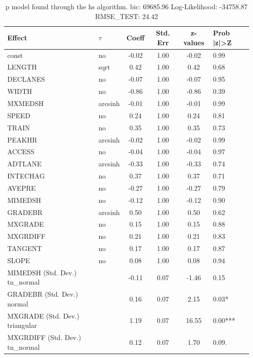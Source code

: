 \begin{table}
	\caption{p model found through the hs algorithm. bic: 69685.96 Log-Likelihood: -34758.87 RMSE_TEST: 24.42}
	\begin{center}
		\begin{tabular}{|l|l|c|c|c|l|}
			\hline
			Effect & $\tau$ & Coeff & Std. Err & z-values & Prob |z|>Z \\
			\hline
			const & no & -0.02 & 1.00 & -0.02 & 0.99 \\
			\hline
			LENGTH & sqrt & 0.42 & 1.00 & 0.42 & 0.68 \\
			\hline
			DECLANES & no & -0.07 & 1.00 & -0.07 & 0.95 \\
			\hline
			WIDTH & no & -0.86 & 1.00 & -0.86 & 0.39 \\
			\hline
			MXMEDSH & arcsinh & -0.01 & 1.00 & -0.01 & 0.99 \\
			\hline
			SPEED & no & 0.24 & 1.00 & 0.24 & 0.81 \\
			\hline
			TRAIN & no & 0.35 & 1.00 & 0.35 & 0.73 \\
			\hline
			PEAKHR & arcsinh & -0.02 & 1.00 & -0.02 & 0.99 \\
			\hline
			ACCESS & no & -0.04 & 1.00 & -0.04 & 0.97 \\
			\hline
			ADTLANE & arcsinh & -0.33 & 1.00 & -0.33 & 0.74 \\
			\hline
			INTECHAG & no & 0.37 & 1.00 & 0.37 & 0.71 \\
			\hline
			AVEPRE & no & -0.27 & 1.00 & -0.27 & 0.79 \\
			\hline
			MIMEDSH & no & -0.12 & 1.00 & -0.12 & 0.90 \\
			\hline
			GRADEBR & arcsinh & 0.50 & 1.00 & 0.50 & 0.62 \\
			\hline
			MXGRADE & no & 0.15 & 1.00 & 0.15 & 0.88 \\
			\hline
			MXGRDIFF & no & 0.21 & 1.00 & 0.21 & 0.83 \\
			\hline
			TANGENT & no & 0.17 & 1.00 & 0.17 & 0.87 \\
			\hline
			SLOPE & no & 0.08 & 1.00 & 0.08 & 0.94 \\
			\hline
			MIMEDSH (Std. Dev.) tn_normal &  & -0.11 & 0.07 & -1.46 & 0.15 \\
			\hline
			GRADEBR (Std. Dev.) normal &  & 0.16 & 0.07 & 2.15 & 0.03* \\
			\hline
			MXGRADE (Std. Dev.) triangular &  & 1.19 & 0.07 & 16.55 & 0.00*** \\
			\hline
			MXGRDIFF (Std. Dev.) tn_normal &  & 0.12 & 0.07 & 1.70 & 0.09. \\

\end{tabular}
\end{center}
\end{table}
